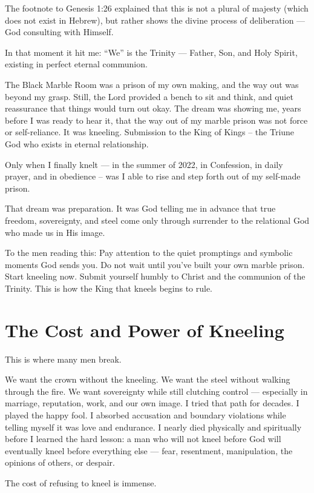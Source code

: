 \documentclass[12pt,a4paper]{book}
\begin{document}
The footnote to Genesis 1:26 explained that this is not a plural of majesty (which does not exist in Hebrew), but rather shows the divine process of deliberation — God consulting with Himself.

In that moment it hit me: “We” is the Trinity — Father, Son, and Holy Spirit, existing in perfect eternal communion.

The Black Marble Room was a prison of my own making, and the way out was beyond my grasp.  Still, the Lord provided a bench to sit and think, and quiet reassurance that things would turn out okay.  The dream was showing me, years before I was ready to hear it, that the way out of my marble prison was not force or self-reliance. It was kneeling.  Submission to the King of Kings -- the Triune God who exists in eternal relationship.

Only when I finally knelt — in the summer of 2022, in Confession, in daily prayer, and in obedience -- was I able to rise and step forth out of my self-made prison.

That dream was preparation.  It was God telling me in advance that true freedom, sovereignty, and steel come only through surrender to the relational God who made us in His image.

To the men reading this: Pay attention to the quiet promptings and symbolic moments God sends you. Do not wait until you’ve built your own marble prison. Start kneeling now. Submit yourself humbly to Christ and the communion of the Trinity. This is how the King that kneels begins to rule.

\section{The Cost and Power of Kneeling}

This is where many men break.

We want the crown without the kneeling. We want the steel without walking through the fire. We want sovereignty while still clutching control — especially in marriage, reputation, work, and our own image. I tried that path for decades. I played the happy fool. I absorbed accusation and boundary violations while telling myself it was love and endurance. I nearly died physically and spiritually before I learned the hard lesson: a man who will not kneel before God will eventually kneel before everything else — fear, resentment, manipulation, the opinions of others, or despair.

The cost of refusing to kneel is immense.
\end{document}
